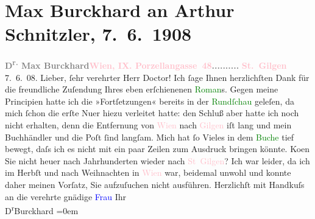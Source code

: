 

               \section[Max Burckhard an Arthur Schnitzler, 7. 6. 1908]{ Max Burckhard an Arthur Schnitzler, 7. 6. 1908}\nopagebreak{}\rehead{ }\normalsize\beginnumbering{} \toendnotes[C]{\smallbreak\pagebreak[2]} 
\toendnotes[C]{\smallbreak}\pstart
           \noindent{}{\pb}\textcolor{gray}{\textbf{D\textsuperscript{r.} Max Burckhard}}\hfill \textcolor{gray}{\textbf{\textcolor{pink}{Wien, IX. Porzellangasse 48}{}\ledrightnote{\textcolor{pink}{Porzellangasse}}{ }..........}}\pend
           \pstart
           \raggedleft{}\textcolor{gray}{\textbf{\textcolor{pink}{St. Gilgen}{}\ledrightnote{\textcolor{pink}{St. Gilgen}}}}{ }7. 6. 08.\pend
           \pstart{}Lieber, ſehr verehrter Herr Doctor!\pend\pstart
           Ich ſage Ihnen herzlichſten Dank für die freundliche Zuſendung Ihres eben
                    erſchienenen \textcolor{green}{Roman}{}s. Gegen
                    meine Principien hatte ich die »Fortſetzungen« bereits in der \textcolor{green}{Rundſchau}{}\ledrightnote{\textcolor{green}{Die neue Rundschau}} geleſen, da mich ſchon die erſte Nu{\geminationm}er hiezu verleitet hatte: den Schluß aber hatte
                    ich noch nicht erhalten, denn die Entfernung von \textcolor{pink}{Wien}{}\ledrightnote{\textcolor{pink}{Wien}} nach \textcolor{pink}{Gilgen}{}\ledrightnote{\textcolor{pink}{St. Gilgen}} iſt lang und mein
                    Buchhändler und die Poſt ſind langſam. Mich hat ſo Vieles in dem \textcolor{green}{Buche}{} tief bewegt, daſs ich es nicht mit
                    ein paar Zeilen zum Ausdruck bringen könnte.\pend
           \pstart
           Ko{\geminationm}en Sie nicht heuer nach Jahrhunderten wieder nach
                        \textcolor{pink}{St Gilgen}{}\ledrightnote{\textcolor{pink}{St. Gilgen}}? Ich war leider, da ich im Herbſt
                    und nach Weihnachten in \textcolor{pink}{Wien}{}\ledrightnote{\textcolor{pink}{Wien}} war, beidemal
                    unwohl und konnte daher meinen Vorſatz, Sie aufzuſuchen nicht ausführen.\pend
           \pstart
           Herzlichſt mit Handkuſs an die verehrte gnädige \textcolor{blue}{Frau}{}\pend
           \pstart
           Ihr{\\[\baselineskip]}\spacefill\mbox{D\textsuperscript{r}Burckhard}\pend
           \leftskip=0em{}\endnumbering{}  
      